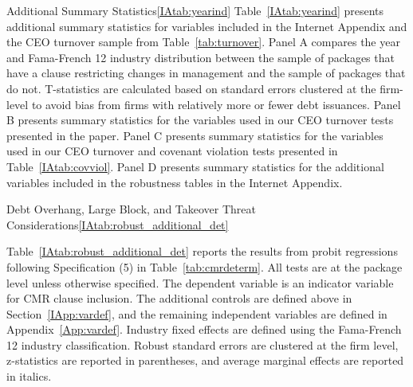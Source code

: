 \documentclass[12pt]{article}
\begin{document}
\begin{appendices}
\begin{singlespace}
\begin{papertable}{Additional Summary Statistics}{\ref{IAtab:yearind}}{}
    Table~\ref{IAtab:yearind} presents additional summary statistics for variables included in the Internet Appendix and the CEO turnover sample from Table~\ref{tab:turnover}.
    Panel A compares the year and Fama-French 12 industry distribution between the sample of packages that have a clause restricting changes in management and the sample of packages that do not.
    T-statistics are calculated based on standard errors clustered at the firm-level to avoid bias from firms with relatively more or fewer debt issuances.
    Panel B presents summary statistics for the variables used in our CEO turnover tests presented in the paper.
    Panel C presents summary statistics for the variables used in our CEO turnover and covenant violation tests presented in Table~\ref{IAtab:covviol}.
    Panel D presents summary statistics for the additional variables included in the robustness tables in the Internet Appendix.

    \startdata
    
    \splittable
    
    \splittablesamepage
    \vspace{-5mm}
    
    \splittable
    
\end{papertable}




\begin{papertable}{Debt Overhang, Large Block, and Takeover Threat Considerations}{\ref{IAtab:robust_additional_det}}{}
  \label{IAtab:robust_additional_det}

  Table~\ref{IAtab:robust_additional_det} reports the results from probit regressions following Specification (5) in Table~\ref{tab:cmrdeterm}.
  All tests are at the package level unless otherwise specified.
  The dependent variable is an indicator variable for CMR clause inclusion.
  The additional controls are defined above in Section~\ref{IApp:vardef}, and the remaining independent variables are defined in Appendix~\ref{App:vardef}.
  Industry fixed effects are defined using the Fama-French 12 industry classification.
  Robust standard errors are clustered at the firm level, z-statistics are reported in parentheses, and average marginal effects are reported in italics.
  \postamblesig

  \startdata
  


\end{papertable}
\end{singlespace}
\end{appendices}
\end{document}
